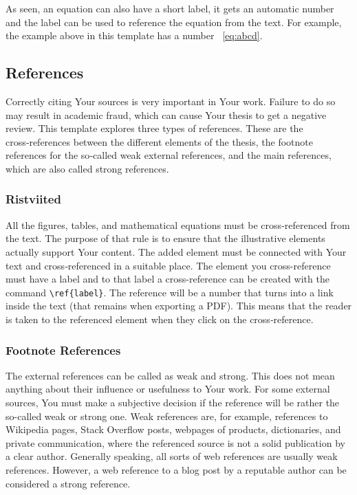 As seen, an equation can also have a short label, it gets an automatic number and the label can be used to reference the equation from the text. For example, the example above in this template has a number ~\ref{eq:abcd}.

\subsection{References}
Correctly citing Your sources is very important in Your work. Failure to do so may result in academic fraud, which can cause Your thesis to get a negative review. This template explores three types of references. These are the cross‑references between the different elements of the thesis, the footnote references for the so‑called weak external references, and the main references, which are also called strong references.

\subsubsection{Ristviited}
All the figures, tables, and mathematical equations must be cross‑referenced from the text. The purpose of that rule is to ensure that the illustrative elements actually support Your content.  The added element must be connected with Your text and cross‑referenced in a suitable place. The element you cross-reference must have a label and to that label a cross-reference can be created with the command \verb|\ref{label}|. The reference will be a number that turns into a link inside the text (that remains when exporting a PDF). This means that the reader is taken to the referenced element when they click on the cross‑reference.

\subsubsection{Footnote References}
The external references can be called as weak and strong. This does not mean anything about their influence or usefulness to Your work. For some external sources, You must make a subjective decision if the reference will be rather the so-called weak or strong one. Weak references are, for example, references to Wikipedia pages, Stack Overflow posts, webpages of products, dictionaries, and private communication, where the referenced source is not a solid publication by a clear author. Generally speaking, all sorts of web references are usually weak references. However, a web reference to a blog post by a reputable author can be considered a strong reference.


